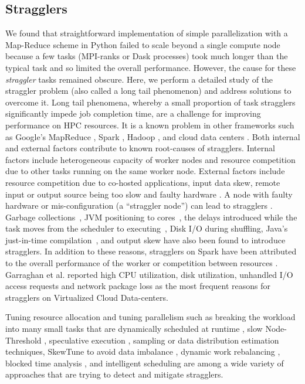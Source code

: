 \label{background}

\subsection{Stragglers}
\label{sec:stragglers}

We found that straightforward implementation of simple parallelization with a Map-Reduce scheme in Python failed to scale beyond a single compute node \cite{Khoshlessan:2017ab} because a few tasks (MPI-ranks or Dask \citep{Rocklin:2015aa} processes) took much longer than the typical task and so limited the overall performance.
However, the cause for these \emph{straggler} tasks remained obscure.
Here, we perform a detailed study of the straggler problem (also called a long tail phenomenon) and address solutions to overcome it.
Long tail phenomena, whereby a small proportion of task stragglers significantly impede job completion time, are a challenge for improving performance \cite{Garraghan2016} on HPC resources.
It is a known problem in other frameworks such as Google's MapReduce \cite{Dean2004}, Spark \cite{Kyong2017,Ousterhout2017,Gittens2016}, Hadoop \cite{Dean2004}, and cloud data centers \cite{Schmidt2016}. Both internal and external factors contribute to known root-causes of stragglers. 
Internal factors include heterogeneous capacity of worker nodes and resource competition due to other tasks running on the same worker node. 
External factors include resource competition due to co-hosted applications, input data skew, remote input or output source being too slow and faulty hardware \cite{Chen2014}.
A node with faulty hardware or mis-configuration (a ``straggler node'') can lead to stragglers \cite{Dean2004}. 
Garbage collections~\cite{Kyong2017,Ousterhout2017}, JVM positioning to cores~\cite{Kyong2017}, the delays introduced while the task moves from the scheduler to executing~\cite{Gittens2016}, Disk I/O during shuffling, Java's just-in-time compilation~\cite{Ousterhout2017}, and output skew \cite{Ousterhout2017} have also been found to introduce stragglers.
In addition to these reasons, stragglers on Spark have been attributed to the overall performance of the worker or competition between resources \cite{Yang2016}.
Garraghan et al. \cite{Garraghan2016} reported high CPU utilization, disk utilization, unhandled I/O access requests and network package loss as the most frequent reasons for stragglers on Virtualized Cloud Data-centers.

Tuning resource allocation and tuning parallelism such as breaking the workload into many small tasks that are dynamically scheduled at runtime \cite{Rosen2012}, slow Node-Threshold \cite{Dean2004}, speculative execution \cite{Dean2004}, sampling or data distribution estimation techniques, SkewTune to avoid data imbalance \cite{Kwon2012}, dynamic work rebalancing \cite{Schmidt2016}, blocked time analysis \cite{Ousterhout2015}, and intelligent scheduling \cite{AWE-WQ2014} are among a wide variety of approaches that are trying to detect and mitigate stragglers. 

